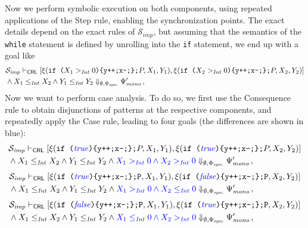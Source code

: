 Now we perform symbolic execution on both components, using repeated applications of the Step rule,
enabling the synchronization points.
The exact details depend on the exact rules of $\mathcal{S}_{\mathit{imp}}$, but assuming that the semantics of
the \texttt{while} statement is defined by unrolling into the \texttt{if} statement,
we end up with a goal like
\begin{align*}
  & \mathcal{S}_{\mathit{imp}} \vdash_{\mathsf{CRL}}
  [ \xi(\texttt{if (}X_1 >_{\mathit{Int}} 0 \texttt{)\{y++;x--;\};}P, X_1, Y_1),  
    \xi(\texttt{if (}X_2 >_{\mathit{Int}} 0 \texttt{)\{y++;x--;\};}P, X_2, Y_2) ] \\
  & \land X_1 \leq_{\mathit{Int}} X_2 \land Y_1 \leq_{\mathit{Int}} Y_2
  \Downarrow_{\emptyset, \Phi_{\mathit{sync}}} \Psi^\prime_{\mathit{mono}} \, ,
\end{align*}
Now we want to perform case analysis. To do so, we first use the Consequence rule to
obtain disjunctions of patterns at the respective components, and repeatedly apply the Case rule, leading to four goals
(the differences are shown in {\color{blue}blue}):
\begin{equation}\label{ex:case1}
\begin{aligned}
  & \mathcal{S}_{\mathit{imp}} \vdash_{\mathsf{CRL}}
  [ \xi(\texttt{if (}{\color{blue}\mathit{true}}\texttt{)\{y++;x--;\};}P, X_1, Y_1),  
    \xi(\texttt{if (}{\color{blue}\mathit{true}}\texttt{)\{y++;x--;\};}P, X_2, Y_2) ] \\
  & \land X_1 \leq_{\mathit{Int}} X_2 \land Y_1 \leq_{\mathit{Int}} Y_2 \land {\color{blue} X_1 >_{\mathit{Int}} 0 \land X_2 >_{\mathit{Int}} 0 }
  \Downarrow_{\emptyset, \Phi_{\mathit{sync}}} \Psi^\prime_{\mathit{mono}} \, ,
\end{aligned}
\end{equation}
\begin{equation}\label{ex:case2}
\begin{aligned}
  & \mathcal{S}_{\mathit{imp}} \vdash_{\mathsf{CRL}}
  [ \xi(\texttt{if (}{\color{blue}\mathit{true}}\texttt{)\{y++;x--;\};P}, X_1, Y_1),  
    \xi(\texttt{if (}{\color{blue}\mathit{false}}\texttt{)\{y++;x--;\};P}, X_2, Y_2) ] \\
  & \land X_1 \leq_{\mathit{Int}} X_2 \land Y_1 \leq_{\mathit{Int}} Y_2 \land {\color{blue} X_1 >_{\mathit{Int}} 0 \land X_2 \leq_{\mathit{Int}} 0 }
  \Downarrow_{\emptyset, \Phi_{\mathit{sync}}} \Psi^\prime_{\mathit{mono}} \, ,
\end{aligned}
\end{equation}
\begin{equation}\label{ex:case3}
\begin{aligned}
  & \mathcal{S}_{\mathit{imp}} \vdash_{\mathsf{CRL}}
  [ \xi(\texttt{if (}{\color{blue}\mathit{false}}\texttt{)\{y++;x--;\};P}, X_1, Y_1),  
    \xi(\texttt{if (}{\color{blue}\mathit{true}}\texttt{)\{y++;x--;\};P}, X_2, Y_2) ] \\
  & \land X_1 \leq_{\mathit{Int}} X_2 \land Y_1 \leq_{\mathit{Int}} Y_2 \land {\color{blue} X_1 \leq_{\mathit{Int}} 0 \land X_2 >_{\mathit{Int}} 0 }
  \Downarrow_{\emptyset, \Phi_{\mathit{sync}}} \Psi^\prime_{\mathit{mono}} \, ,
\end{aligned}
\end{equation}
